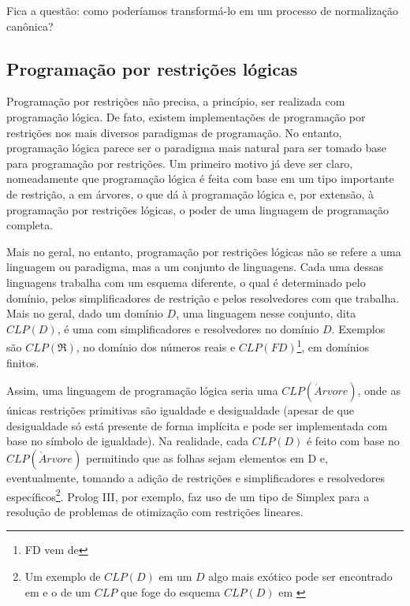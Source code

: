 \documentclass{article}
\begin{document}
Fica a questão: como poderíamos transformá-lo em um processo de normalização canônica?

\subsection{Programação por restrições lógicas}

Programação por restrições não precisa, a princípio, ser realizada com programação lógica. De fato, existem implementações de
programação por restrições nos mais diversos paradigmas de programação. No entanto, programação lógica parece ser o paradigma mais natural
para ser tomado base para programação por restrições. Um primeiro motivo já deve ser claro, nomeadamente que programação lógica é feita com base em um tipo importante de restrição, a em árvores, o que dá à programação lógica e, por extensão, à programação
por restrições lógicas, o poder de uma linguagem de programação completa.

Mais no geral, no entanto, programação por restrições lógicas não se refere a uma linguagem ou paradigma, mas a um conjunto
de linguagens. Cada uma dessas linguagens trabalha com um esquema diferente, o qual é determinado pelo domínio,
pelos simplificadores de restrição e pelos resolvedores com que trabalha. Mais no geral, dado um domínio $D$,
uma linguagem nesse conjunto, dita $CLP(D)$, é uma com simplificadores e resolvedores no domínio $D$.
Exemplos são $CLP(\Re)$, no domínio dos números reais e $CLP(FD)$\footnote{FD vem de }, em domínios finitos.

Assim, uma linguagem de programação lógica  seria uma $CLP(\acute{A}rvore)$, onde as únicas restrições primitivas são igualdade e desigualdade (apesar de que desigualdade só está presente de forma implícita e pode ser implementada com base no símbolo de igualdade).
Na realidade, cada $CLP(D)$ é feito com base no $CLP(\acute{A}rvore)$ permitindo que as folhas sejam elementos em D e, eventualmente, tomando a adição de restrições e simplificadores e resolvedores específicos\footnote{Um exemplo de $CLP(D)$ em um $D$ algo mais exótico pode ser encontrado em \cite{besik} e o de um $CLP$ que foge do esquema $CLP(D)$ em \cite{margarida}}. Prolog III, por exemplo, faz uso de um tipo de Simplex para a resolução
de problemas de otimização com restrições lineares.
\end{document}
